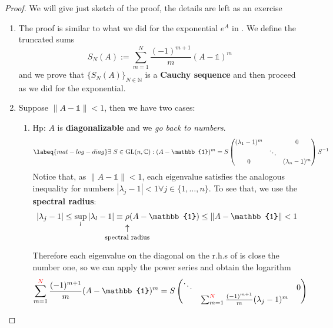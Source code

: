 \documentclass[../main.tex]{subfiles}
\begin{document}
\begin{proof}
We will give just sketch of the proof, the details are left as an exercise
\renewcommand{\labelenumi}{\Alph{enumi})}
\renewcommand{\labelenumii}{\Alph{enumi}\arabic{enumii})}
\begin{enumerate}
    \item The proof is similar to what we did for the exponential $e^A$ in . We define the truncated sums
    \[
    S_N(A):=\sum_{m=1}^N\frac{(-1)^{m+1}}{m}(A-\mathbb{1})^m
    \]
    and we prove that $\{S_N(A)\}_{N\in\mathbb{N}}$ is a \textbf{Cauchy sequence} and then proceed as we did for the exponential.
    \item Suppose $\lVert A-\mathbb{1}\rVert<1$, then we have two cases:
    \begin{enumerate}
        \item Hp: $A$ is \textbf{diagonalizable} and we \textit{go back to numbers}.
\begin{equation}\labeq{mat-log-diag}
\exists\  S\in\text{GL}(n,\mathbb{C}):(A-\mathbb{1})^m=S\begin{pmatrix}
(\lambda_1-1)^m & & 0\\
& \ddots & \\
0 & & (\lambda_n-1)^m
\end{pmatrix}
S^{-1}
\end{equation}
Notice that, as $\lVert A-\mathbb{1}\rVert<1$, each eigenvalue satisfies the analogous inequality for numbers $|\lambda_j-1|<1 \forall j\in\{1,\dots,n\}$. To see that, we use the \textbf{spectral radius}:
\[
|\lambda_j-1|\le \sup_l|\lambda_l-1|\equiv\underset{\mathclap{\tikz \node {$\uparrow$} node [below=1ex] {\footnotesize spectral radius };}}\rho(A-\mathbb{1})\le\lVert A-\mathbb{1}\rVert<1
\]
Therefore each eigenvalue on the diagonal on the r.h.s of  is close the number one, so we can apply the power series and obtain the logarithm
\[
\sum_{m=1}^{{\color{red}N}}\frac{(-1)^{m+1}}{m}(A-\mathbb{1})^m=S\begin{pmatrix}
\ddots & & 0\\
& \sum_{m=1}^{{\color{red}N}}\frac{(-1)^{m+1}}{m}(\lambda_j-1)^m & \\

\end{pmatrix}\]
\end{enumerate}
\end{enumerate}
\end{proof}
\end{document}
